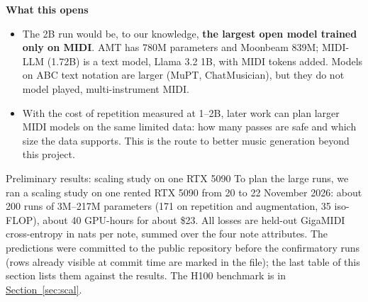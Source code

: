 \documentclass[11pt,a4paper]{article}
\makeatletter
\newcommand{\seclink}[2]{\hyperref[#1]{\textcolor{blue!60!black}{\underline{#2}}}}
\renewcommand\subsection{\@startsection{subsection}{2}{\z@}{-2.6ex \@plus -1ex \@minus -.2ex}{1.2ex \@plus .2ex}%
  {\normalfont\large\bfseries\color{head}}}
\makeatother
\begin{document}
\medskip
\textbf{What this opens}
\begin{itemize}
\item The 2B run would be, to our knowledge, \textbf{the largest open model trained only on MIDI}.
AMT has 780M parameters and Moonbeam 839M; MIDI-LLM (1.72B) is a text model, Llama 3.2 1B, with MIDI tokens added.
Models on ABC text notation are larger (MuPT, ChatMusician), but they do not model played, multi-instrument MIDI.
\item With the cost of repetition measured at 1--2B, later work can plan larger MIDI models on the same limited data:
how many passes are safe and which size the data supports. This is the route to better music generation beyond
this project.
\end{itemize}

\subsection{Preliminary results: scaling study on one RTX 5090}\label{sec:prelim}
To plan the large runs, we ran a scaling study on one rented RTX 5090 from 20 to 22 November 2026: about 200 runs
of 3M--217M parameters (171 on repetition and augmentation, 35 iso-FLOP), about 40 GPU-hours for about \$23. All
losses are held-out GigaMIDI cross-entropy in nats per note, summed over the four note attributes. The predictions were committed to the public repository
before the confirmatory runs (rows already visible at commit time are marked in the file); the last table of this section lists them against the results. The H100 benchmark is in
\seclink{sec:scal}{Section~\ref*{sec:scal}}.
\end{document}

